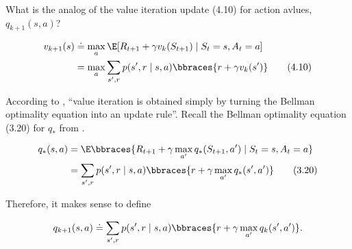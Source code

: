 
\begin{exercise}[Exercise 4.10]

What is the analog of the value iteration update (4.10) for action avlues, $q_{k+1}(s, a)$?

\begin{align*}
    v_{k+1}(s)
    & \doteq
    \max_a
        \E[R_{t+1} + \gamma v_k(S_{t+1}) \mid S_t = s, A_t = a] \\
    & =
    \max_a
        \sum_{s^\prime, r}
            p(s^\prime, r \mid s, a)
            \bbraces{r + \gamma v_k(s^\prime)} \tag{4.10}
\end{align*}

\end{exercise}


\begin{solution}

According to \cite*[page 83]{SuttonRichardS2018Rl:a}, \enquote{value iteration is obtained simply by turning the Bellman optimality equation into an update rule}.
Recall the Bellman optimality equation (3.20) for $q_\ast$ from \cite*[page 64]{SuttonRichardS2018Rl:a}.

\begin{align*}
    q_\ast(s, a)
    & =
    \E
    \bbraces
    {
        R_{t+1} + \gamma \max_{a^\prime} q_\ast(S_{t+1}, a^\prime)
        \mid
        S_t = s, A_t = a
    } \\
    & =
    \sum_{s^\prime, r}
        p(s^\prime, r \mid s, a)
        \bbraces
        {
            r + \gamma \max_{a^\prime} q_\ast(s^\prime, a^\prime)
        } \tag{3.20}
\end{align*}

Therefore, it makes sense to define

\begin{align*}
    q_{k+1}(s, a)
    \doteq
    \sum_{s^\prime, r}
        p(s^\prime, r \mid s, a)
        \bbraces
        {
            r + \gamma \max_{a^\prime} q_k(s^\prime, a^\prime)
        }.
\end{align*}

\end{solution}

